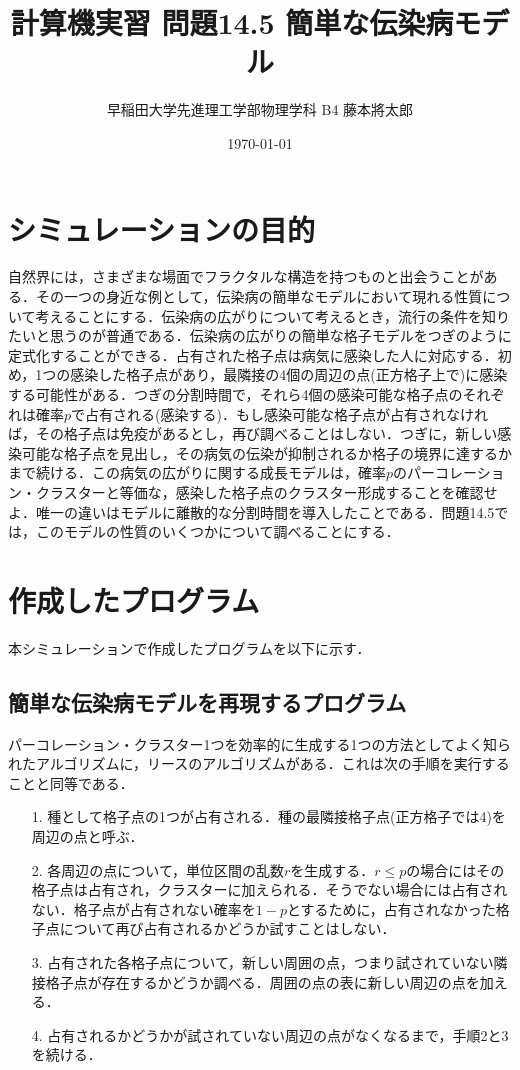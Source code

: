 \documentclass{jsarticle}
\title{計算機実習 問題14.5 簡単な伝染病モデル}
\author{早稲田大学先進理工学部物理学科 B4 藤本將太郎}
\date{\today}
\begin{document}
\maketitle
    
    \section{シミュレーションの目的}
    自然界には，さまざまな場面でフラクタルな構造を持つものと出会うことがある．その一つの身近な例として，伝染病の簡単なモデルにおいて現れる性質について考えることにする．伝染病の広がりについて考えるとき，流行の条件を知りたいと思うのが普通である．伝染病の広がりの簡単な格子モデルをつぎのように定式化することができる．占有された格子点は病気に感染した人に対応する．初め，1つの感染した格子点があり，最隣接の4個の周辺の点(正方格子上で)に感染する可能性がある．つぎの分割時間で，それら4個の感染可能な格子点のそれぞれは確率$p$で占有される(感染する)．もし感染可能な格子点が占有されなければ，その格子点は免疫があるとし，再び調べることはしない．つぎに，新しい感染可能な格子点を見出し，その病気の伝染が抑制されるか格子の境界に達するかまで続ける．この病気の広がりに関する成長モデルは，確率$p$のパーコレーション・クラスターと等価な，感染した格子点のクラスター形成することを確認せよ．唯一の違いはモデルに離散的な分割時間を導入したことである．問題14.5では，このモデルの性質のいくつかについて調べることにする．
    
    \section{作成したプログラム}
        本シミュレーションで作成したプログラムを以下に示す．
        
        \subsection{簡単な伝染病モデルを再現するプログラム}
            
            パーコレーション・クラスター1つを効率的に生成する1つの方法としてよく知られたアルゴリズムに，リースのアルゴリズムがある．これは次の手順を実行することと同等である．
            
            \begin{itemize}
                \item[1.] 種として格子点の1つが占有される．種の最隣接格子点(正方格子では4)を周辺の点と呼ぶ．
                \item[2.] 各周辺の点について，単位区間の乱数$r$を生成する．$r \le p$の場合にはその格子点は占有され，クラスターに加えられる．そうでない場合には占有されない．格子点が占有されない確率を$1-p$とするために，占有されなかった格子点について再び占有されるかどうか試すことはしない．
                \item[3.] 占有された各格子点について，新しい周囲の点，つまり試されていない隣接格子点が存在するかどうか調べる．周囲の点の表に新しい周辺の点を加える．
                \item[4.] 占有されるかどうかが試されていない周辺の点がなくなるまで，手順2と3を続ける．
            \end{itemize}
\end{document}
